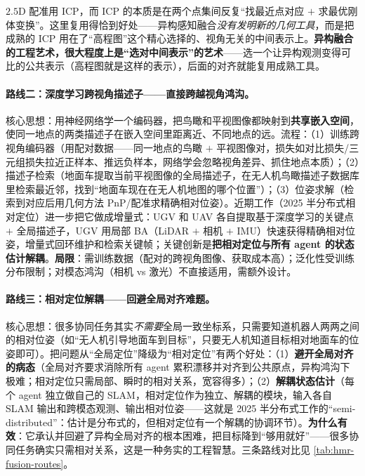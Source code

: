 \begin{insight}
$2.5\mathrm{D}$ 配准用 ICP，而 ICP 的本质是在两个点集间反复“找最近点对应 $+$ 求最优刚体变换”。这里复用得恰到好处——异构感知融合\emph{没有发明新的几何工具}，而是把成熟的 ICP 用在了“高程图”这个精心选择的、视角无关的中间表示上。\textbf{异构融合的工程艺术，很大程度上是“选对中间表示”的艺术}——选一个让异构观测变得可比的公共表示（高程图就是这样的表示），后面的对齐就能复用成熟工具。
\end{insight}

\paragraph{路线二：深度学习跨视角描述子——直接跨越视角鸿沟。}
核心思想：用神经网络学一个编码器，把鸟瞰和平视图像都映射到\textbf{共享嵌入空间}，使同一地点的两类描述子在嵌入空间里距离近、不同地点的远。流程：（1）训练跨视角编码器（用配对数据——同一地点的鸟瞰 $+$ 平视图像对，损失如对比损失/三元组损失拉近正样本、推远负样本，网络学会忽略视角差异、抓住地点本质）；（2）描述子检索（地面车提取当前平视图像的全局描述子，在无人机鸟瞰描述子数据库里检索最近邻，找到“地面车现在在无人机地图的哪个位置”）；（3）位姿求解（检索到对应后用几何方法 PnP/配准求精确相对位姿）。近期工作（2025 半分布式相对定位\cite{crossmodal2025semidist}）进一步把它做成增量式：UGV 和 UAV 各自提取基于深度学习的关键点 $+$ 全局描述子，UGV 用局部 BA（LiDAR $+$ 相机 $+$ IMU）快速获得精确相对位姿，增量式回环维护和检索关键帧；关键创新是\textbf{把相对定位与所有 agent 的状态估计解耦}。\textbf{局限}：需训练数据（配对的跨视角图像、获取成本高）；泛化性受训练分布限制；对模态鸿沟（相机 vs 激光）不直接适用，需额外设计。

\paragraph{路线三：相对定位解耦——回避全局对齐难题。}
核心思想：很多协同任务其实\emph{不需要}全局一致坐标系，只需要知道机器人两两之间的相对位姿（如“无人机引导地面车到目标”，只要无人机知道目标相对地面车的位姿即可）。把问题从“全局定位”降级为“相对定位”有两个好处：（1）\textbf{避开全局对齐的病态}（全局对齐要求消除所有 agent 累积漂移并对齐到公共原点，异构鸿沟下极难；相对定位只需局部、瞬时的相对关系，宽容得多）；（2）\textbf{解耦状态估计}（每个 agent 独立做自己的 SLAM，相对定位作为独立、解耦的模块，输入各自 SLAM 输出和跨模态观测、输出相对位姿——这就是 2025 半分布式工作的“semi-distributed”：估计是分布式的，但相对定位有一个解耦的协调环节）。\textbf{为什么有效}：它承认并回避了异构全局对齐的根本困难，把目标降到“够用就好”——很多协同任务确实只需相对关系，这是一种务实的工程智慧。三条路线对比见 \cref{tab:hmr-fusion-routes}。

